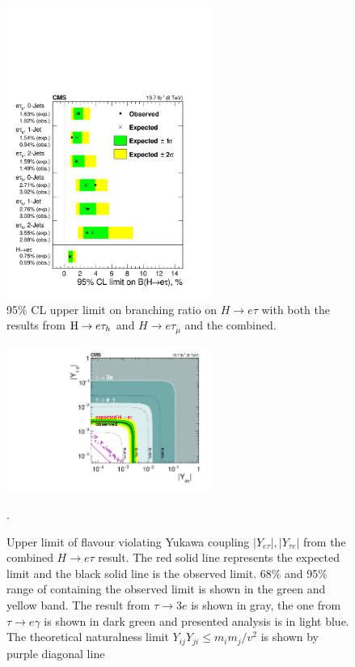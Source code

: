 \begin{figure}[htpb]
\begin{center}
\includegraphics[width=0.6\textwidth]{chapter8/HEtau_summary.pdf}
\end{center}
\caption{95\% CL upper limit on branching ratio on $H \to e \tau$ with both the results from $\mathrm{H} \to e \tau_{h}$ and $H \to e \tau_{\mu}$ and the combined. }

\label{fig:Etaulimitsummary}
\end{figure}


\begin{figure}[htpb]
\begin{center}
\includegraphics[width=0.6\textwidth]{chapter8/EtauYukawa.pdf}\label{fig:etauYukawa}
\end{center}

\caption[Upper limit of flavour violating Yukawa coupling in $H\to e\tau$ analysis]{Upper limit of flavour violating Yukawa coupling $|Y_{e\tau}|, |Y_{\tau e}|$ from the combined $H \to e \tau$ result. The red solid line represents the expected limit and the black solid line is the observed limit. 68\% and 95\% range of containing the observed limit is shown in the green and yellow band. The result from $\tau \to 3e$ is shown in gray, the one from $\tau \to e\gamma$ is shown in dark green and presented analysis is in light blue. The theoretical naturalness limit $Y_{ij}Y_{ji} \leq m_im_j/v^2$ is shown by purple diagonal line~\cite{Harnik:2012pb}}.
\label{fig:etauYukawas}
\end{figure}




